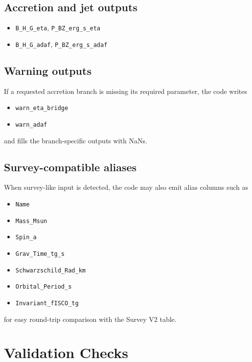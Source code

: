 \documentclass[12pt]{article}
\begin{document}
\subsection*{Accretion and jet outputs}
\begin{itemize}
    \item \texttt{B\_H\_G\_eta}, \texttt{P\_BZ\_erg\_s\_eta}
    \item \texttt{B\_H\_G\_adaf}, \texttt{P\_BZ\_erg\_s\_adaf}
\end{itemize}

\subsection*{Warning outputs}
If a requested accretion branch is missing its required parameter, the code writes
\begin{itemize}
    \item \texttt{warn\_eta\_bridge}
    \item \texttt{warn\_adaf}
\end{itemize}
and fills the branch-specific outputs with NaNs.

\subsection*{Survey-compatible aliases}
When survey-like input is detected, the code may also emit alias columns such as
\begin{itemize}
    \item \texttt{Name}
    \item \texttt{Mass\_Msun}
    \item \texttt{Spin\_a}
    \item \texttt{Grav\_Time\_tg\_s}
    \item \texttt{Schwarzschild\_Rad\_km}
    \item \texttt{Orbital\_Period\_s}
    \item \texttt{Invariant\_fISCO\_tg}
\end{itemize}
for easy round-trip comparison with the Survey V2 table.

\section{Validation Checks}
\end{document}
